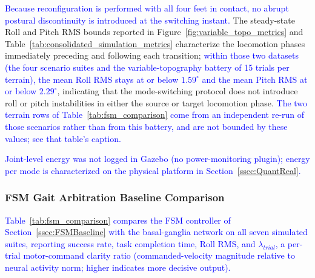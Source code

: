 \documentclass[preprint,12pt]{elsarticle}
\newcommand{\revblue}[1]{\textcolor{blue}{#1}}
\begin{document}
%
\revblue{Because reconfiguration is performed with all four feet in contact, no abrupt postural discontinuity is introduced at the switching instant.}
The steady-state Roll and Pitch RMS bounds reported in
Figure~\ref{fig:variable_topo_metrics}
and Table~\ref{tab:consolidated_simulation_metrics}
characterize the locomotion phases immediately preceding and
following each transition; \revblue{within those two datasets (the four scenario suites and the variable-topography battery of 15 trials per terrain), the mean Roll RMS stays at or below $1.59^\circ$ and the mean
Pitch RMS at or below $2.29^\circ$},
indicating that the mode-switching protocol does not introduce
roll or pitch instabilities in either the source or target
locomotion phase. \revblue{The two terrain rows of
Table~\ref{tab:fsm_comparison} come from an independent re-run of those
scenarios rather than from this battery, and are not bounded by these
values; see that table's caption.}


%
\revblue{Joint-level energy was not logged in Gazebo (no power-monitoring plugin); energy per mode is characterized on the physical platform in Section~\ref{ssec:QuantReal}.}


\subsubsection{FSM Gait Arbitration Baseline Comparison}
\label{sssec:fsm_baseline_comparison}

\revblue{Table~\ref{tab:fsm_comparison} compares the FSM controller of Section~\ref{ssec:FSMBaseline} with the basal-ganglia network on all seven simulated suites, reporting success rate, task completion time, Roll RMS, and $\lambda_{trial}$, a per-trial motor-command clarity ratio (commanded-velocity magnitude relative to neural activity norm; higher indicates more decisive output).}
\end{document}
